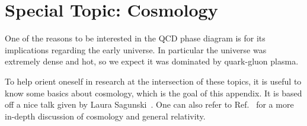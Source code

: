 \chapter{Special Topic: Cosmology}\label{ap:cosmology}

One of the reasons to be interested in the QCD phase diagram is for its
implications regarding the early universe. In particular the universe was
extremely dense and hot, so we expect it was dominated by quark-gluon plasma.

To help orient oneself in research at the intersection of these topics, it is
useful to know some basics about cosmology, which is the goal of this appendix.
It is based off a nice talk given by Laura Sagunski~\cite{sagunski22}.
One can also refer to
Ref.~\cite{weinberg_cosmology_2008,misner_gravitation_1975}
for a more in-depth discussion of cosmology and general relativity. 



